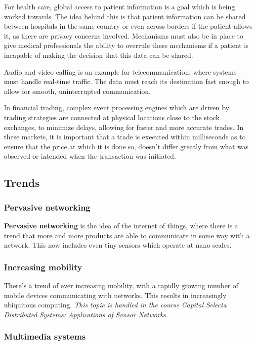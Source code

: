 \documentclass[a4paper]{article}
\begin{document}
For health care, global access to patient information is a goal which is being worked towards. The idea behind this is that patient information can be shared between hospitals in the same country or even across borders if the patient allows it, as there are privacy concerns involved. Mechanisms must also be in place to give medical professionals the ability to overrule these mechanisms if a patient is incapable of making the decision that this data can be shared.

Audio and video calling is an example for telecommunication, where systems must handle real-time traffic. The data must reach its destination fast enough to allow for smooth, uninterrupted communication.

In financial trading, complex event processing engines which are driven by trading strategies are connected at physical locations close to the stock exchanges, to minimize delays, allowing for faster and more accurate trades. In these markets, it is important that a trade is executed within milliseconds as to ensure that the price at which it is done so, doesn't differ greatly from what was observed or intended when the transaction was initiated.

\subsection{Trends}

\subsubsection{Pervasive networking}

\textbf{Pervasive networking} is the idea of the internet of things, where there is a trend that more and more products are able to communicate in some way with a network. This now includes even tiny sensors which operate at nano scales.

\subsubsection{Increasing mobility}

There's a trend of ever increasing mobility, with a rapidly growing number of mobile devices communicating with networks. This results in increasingly ubiquitous computing. \textit{This topic is handled in the course Capital Selecta Distributed Systems: Applications of Sensor Networks}.

\subsubsection{Multimedia systems}
\end{document}

